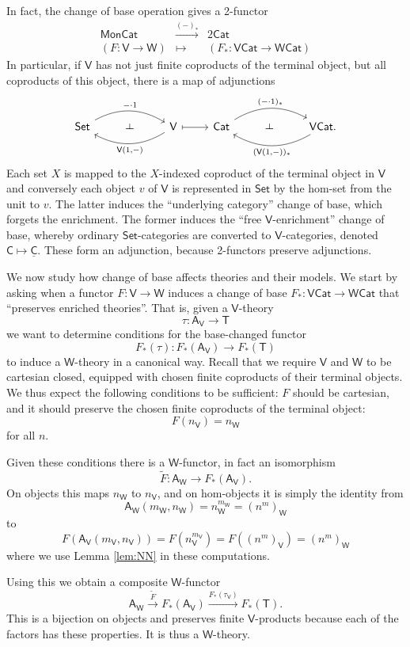 \documentclass{amsart}
\theoremstyle{definition}
\def\ld{\rotatebox[origin=c]{-90}{$\dashv$}} %
\newcommand{\Set}{\mathsf{Set}}
\newcommand{\Cat}{\mathsf{Cat}}
\newcommand{\Mon}{\mathsf{Mon}}
\newcommand{\A}{\mathsf{A}}
\newcommand{\V}{\mathsf{V}}
\newcommand{\W}{\mathsf{W}}
\newcommand{\C}{\mathsf{C}}
\newcommand{\T}{\mathsf{T}}
\newcommand{\maps}{\colon}
\begin{document}
In fact, the change of base operation gives a 2-functor
\[\begin{array}{ccc}
\Mon\Cat & \xrightarrow{(-)_*} & 2\Cat\\
(F\maps \V\to\W) & \mapsto & (F_*\maps \V\Cat\to\W\Cat)
\end{array}\]
In particular, if $\V$ has not just finite coproducts of the terminal object, but all 
coproducts of this object, there is a map of adjunctions
\[\begin{tikzcd}
	\Set \arrow[bend left,below]{rr}{-\cdot 1}
	& \ld &
	\arrow[bend left,above]{ll}{\V(1,-)} \V
	\arrow[maps to]{r}
	& \Cat \arrow[bend left,below]{rr}{(-\cdot 1)_*}
	& \ld &
	\arrow[bend left,above]{ll}{(\V(1,-))_*} \V\Cat.
\end{tikzcd}\]
Each set $X$ is mapped to the $X$-indexed coproduct of the terminal object in $\V$ and conversely each object $v$ of $\V$ is represented in $\Set$ by the hom-set from the unit to $v$. The latter induces the ``underlying category'' change of base, which forgets the enrichment. The former induces the ``free $\V$-enrichment'' change of base, whereby ordinary $\Set$-categories are converted to $\V$-categories, denoted $\C \mapsto \underline{\C}$. These form an adjunction, because 2-functors preserve adjunctions.

We now study how change of base affects theories and their models.  We start by asking when a functor $F \maps \V \to \W$ induces a change of base $F_*\maps\V\Cat \to \W\Cat$ that ``preserves enriched theories''.   That is, given a $\V$-theory 
\[      \tau \maps  \A_\V \to \T \]
we want to determine conditions for the base-changed functor 
\[    F_*(\tau) \maps  F_*(\A_\V) \to  F_*(\T) \]
to induce a $\W$-theory in a canonical way.   Recall that we require $\V$ and $\W$ to be
cartesian closed, equipped with chosen finite coproducts of their terminal objects.   We thus expect the following conditions to be sufficient: $F$ should be cartesian, and it should
preserve the chosen finite coproducts of the terminal object:
\[      F(n_\V) = n_\W  \]
for all $n$.   

Given these conditions there is a $\W$-functor, in fact an isomorphism
\[    \tilde{F} \maps \A_\W \to F_*(\A_\V)  . \]
On objects this maps $n_\W$ to $n_\V$, and on hom-objects it is simply the identity from
\[     \A_\W(m_\W, n_\W) = n_\W^{m_\W} = (n^m)_\W \]
to 
\[    F(\A_\V(m_\V, n_\V)) = F(n_\V^{m_\V}) = F((n^m)_\V) = (n^m)_\W \]
where we use Lemma \ref{lem:NN} in these computations.

Using this we obtain a composite $\W$-functor
\[   \A_\W \stackrel{\tilde{F}}{\longrightarrow} 
  F_*(\A_\V) \xrightarrow{F_*(\tau_\V)} F_*(\T). \]
This is a bijection on objects and preserves finite $\V$-products because each of the factors
has these properties.   It is thus a $\W$-theory.   
\end{document}
